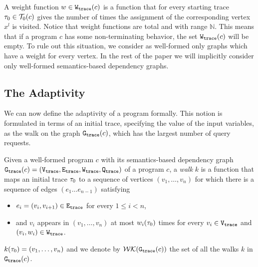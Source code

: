 A weight function $w \in \mathtt{{W_{trace}}}(c)$ is a function that for every starting trace $\mathtt{\tau}_0 \in \mathcal{T}_0(c)$ 
gives the number of times the assignment of the corresponding vertex $x^l$ is visited. Notice that weight functions are total and with range $\mathbb{N}$. This means that if a program $c$ has some non-terminating behavior, the set $\mathtt{{W_{trace}}}(c)$ will be empty. 
To rule out this situation, we consider as well-formed only graphs which have a weight for every vertex. 
In the rest of the paper we will implicitly consider only well-formed semantics-based dependency graphs. 

  \subsection{The Adaptivity}
We can now define the adaptivity of a program formally. This notion is formulated in terms of an initial trace, specifying the value of the input variables, as the walk on the graph $\mathtt{{G_{trace}}}({c})$, which has the largest number of query requests.
\begin{defn}[Walk]
\label{def:finitewalk}
Given a well-formed program $c$ with its semantics-based dependency graph $\mathtt{{G_{trace}}}({c}) = (\mathtt{{V_{trace}}}, \mathtt{{E_{trace}}}, \mathtt{{W_{trace}}}, \mathtt{{Q_{trace}}})$ of a program $c$, a \emph{walk} $k$ is a function that maps an initial trace $\mathtt{\tau}_0$ to a sequence of vertices $(v_1, \ldots, v_{n})$
for which there is a sequence of edges $(e_1 \ldots e_{n - 1})$  satisfying
\begin{itemize}
\item $e_i = (v_{i},v_{i + 1}) \in \mathtt{{E_{trace}}}$ for every $1 \leq i < n$,
\item and $v_i$ appears in $(v_1, \ldots, v_{n})$ at most $w_i(\mathtt{\tau}_0)$ times for every $v_i \in \mathtt{{V_{trace}}}$ and $(v_i, w_i) \in \mathtt{{W_{trace}}}$.  
\end{itemize}
$k(\mathtt{\tau}_0) = (v_1, \ldots, v_{n})$
and we denote by $\mathcal{WK}(\mathtt{{G_{trace}}}(c))$
the set of all the walks $k$ in $\mathtt{{G_{trace}}}(c)$.
\end{defn} 

